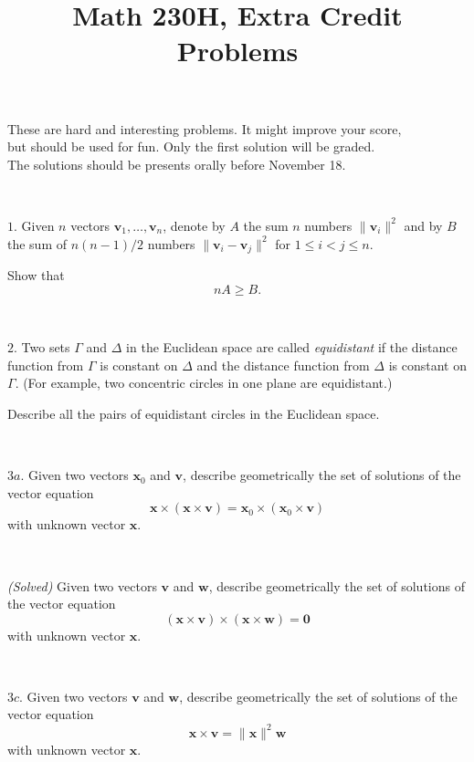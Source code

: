\documentclass{article}
\def\noi{\noindent}%
\def\ge{\geqslant}%
\def\le{\leqslant}%
\begin{document}
\title{Math 230H, Extra Credit Problems}
\author{}
\date{}
\maketitle

\begin{center}
{\small These are hard and interesting problems.
It might improve your score,\\
but should be used for fun. 
Only the first solution will be graded. 
\\ The solutions should 
be presents orally before November 18.}
\end{center}
\thispagestyle{empty}

\ 


\noi
$1$. 
Given $n$ vectors $\mathbf{v}_1,\dots,\mathbf{v}_n$, 
denote by $A$ the sum $n$ numbers $\|\mathbf{v}_i\|^2$
and by $B$ the sum of $n(n-1)/2$ numbers 
$\|\mathbf{v}_i-\mathbf{v}_j\|^2$ for $1\le i<j\le n$.

Show that 
\[n A\ge B.\]

\ 

\noi
$2$. 
Two sets $\Gamma$ and $\Delta$ in the Euclidean space 
are called \emph{equidistant} if the distance function from $\Gamma$ is constant on $\Delta$ and the distance function from $\Delta$ is constant on $\Gamma$.
(For example, two concentric circles in one plane are equidistant.)

Describe all the pairs of equidistant circles in the Euclidean space.

\ 

\noi
$3a$. 
Given two vectors $\mathbf{x}_0$ and $\mathbf{v}$,
describe geometrically the set of solutions of the vector equation
\[\mathbf{x}\times(\mathbf{x}\times\mathbf{v})=\mathbf{x}_0\times(\mathbf{x}_0\times\mathbf{v})\]
with unknown vector  $\mathbf{x}$.

\ 

\noi
{}\textit{(Solved)} 
Given two vectors $\mathbf{v}$ and $\mathbf{w}$,
describe geometrically the set of solutions of the vector equation
\[(\mathbf{x}\times\mathbf{v})\times(\mathbf{x}\times\mathbf{w})=\mathbf{0}\]
with unknown vector  $\mathbf{x}$.

\ 

\noi
$3c$. 
Given two vectors $\mathbf{v}$ and $\mathbf{w}$,
describe geometrically the set of solutions of the vector equation
\[\mathbf{x}\times\mathbf{v}=\|\mathbf{x}\|^2\mathbf{w}\]
with unknown vector  $\mathbf{x}$.
\end{document}
